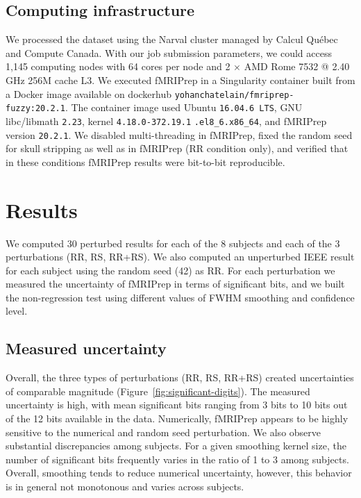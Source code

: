 \documentclass{article}
\newcommand{\TG}[1]{\color{blue}\textsc{From Tristan:} #1\color{black}\xspace}
\newcommand{\fmriprep}{fMRIPrep\xspace}
\begin{document}


\subsection{Computing infrastructure}

We processed the dataset using the Narval cluster managed by Calcul Qu\'ebec and
Compute Canada. With our job submission parameters, we could access 1,145
computing nodes with 64 cores per node and 2 $\times$ AMD Rome 7532 @ 2.40 GHz
256M cache L3. We executed \fmriprep in a Singularity container built from a
Docker image available on dockerhub \texttt{yohanchatelain/fmriprep-fuzzy:20.2.1}.
The container image used Ubuntu \texttt{16.04.6 LTS}, GNU
libc/libmath \texttt{2.23}, kernel \texttt{4.18.0-372.19.1}
\texttt{.el8\_6.x86\_64}, and fMRIPrep version \texttt{20.2.1}. We disabled
multi-threading in fMRIPrep, fixed the random seed for skull stripping as well
as in fMRIPrep (RR condition only), and verified that in these conditions
fMRIPrep results were bit-to-bit reproducible.

\section{Results}

We computed 30 perturbed results for each of the 8 subjects and each of the 3
perturbations (RR, RS, RR+RS). We also computed an unperturbed IEEE
result for each subject using the random seed (42) as RR. For each perturbation we
measured the uncertainty of fMRIPrep in terms of significant bits, and we
built the non-regression test using different values of FWHM smoothing and confidence level.

\subsection{Measured uncertainty}

Overall, the three types of perturbations (RR, RS, RR+RS) created uncertainties
of comparable magnitude (Figure~\ref{fig:significant-digits}). The measured
uncertainty is high, with mean significant bits ranging from 3 bits to 10 bits
out of the 12 bits available in the data. Numerically, \fmriprep appears to be
highly sensitive to the numerical and random seed perturbation. We also observe
substantial discrepancies among subjects. For a given smoothing kernel size, the
number of significant bits frequently varies in the ratio of 1 to 3 among
subjects. Overall, smoothing tends to reduce numerical uncertainty, however,
this behavior is in general not monotonous and varies across subjects.
\end{document}
